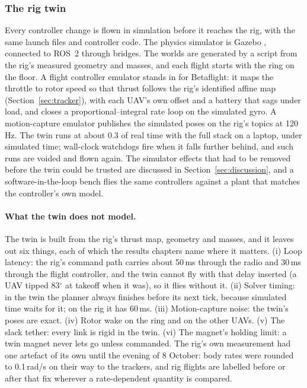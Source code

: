 


\subsubsection{The rig twin}
\label{sec:simulation}

Every controller change is flown in simulation before it reaches the rig, with the same launch files and
controller code. The physics simulator is Gazebo \cite{koenig2004gazebo}, connected to ROS~2
\cite{macenski2022ros2} through bridges. The worlds are generated by a script from the rig's measured geometry
and masses, and each flight starts with the ring on the floor. A flight controller emulator stands in for
Betaflight: it maps the throttle to rotor speed so that thrust follows the rig's identified affine map
(Section~\ref{sec:tracker}), with each UAV's own offset and a battery that sags under load, and closes a
proportional--integral rate loop on the simulated gyro. A motion-capture emulator publishes the simulated poses
on the rig's topics at 120\,Hz. The twin runs at about 0.3 of real time with the full stack on a laptop, under
simulated time; wall-clock watchdogs fire when it falls further behind, and such runs are voided and flown again.
The simulator effects that had to be removed before the twin could be trusted are discussed in
Section~\ref{sec:discussion}, and a software-in-the-loop bench flies the same controllers against a plant that
matches the controller's own model.

\paragraph{What the twin does not model.} The twin is built from the rig's thrust map, geometry and masses, and
it leaves out six things, each of which the results chapters name where it matters. (i) Loop latency: the rig's
command path carries about 50\,ms through the radio and 30\,ms through the flight controller, and the twin cannot
fly with that delay inserted (a UAV tipped 83$^\circ$ at takeoff when it was), so it flies without it. (ii) Solver
timing: in the twin the planner always finishes before its next tick, because simulated time waits for it; on the
rig it has 60\,ms. (iii) Motion-capture noise: the twin's poses are exact. (iv) Rotor wake on the ring and on the
other UAVs. (v) The slack tether: every link is rigid in the twin. (vi) The magnet's holding limit: a twin magnet
never lets go unless commanded. The rig's own measurement had one artefact of its own until the evening of
8 October: body rates were rounded to 0.1\,rad/s on their way to the trackers, and rig flights are labelled before
or after that fix wherever a rate-dependent quantity is compared.

